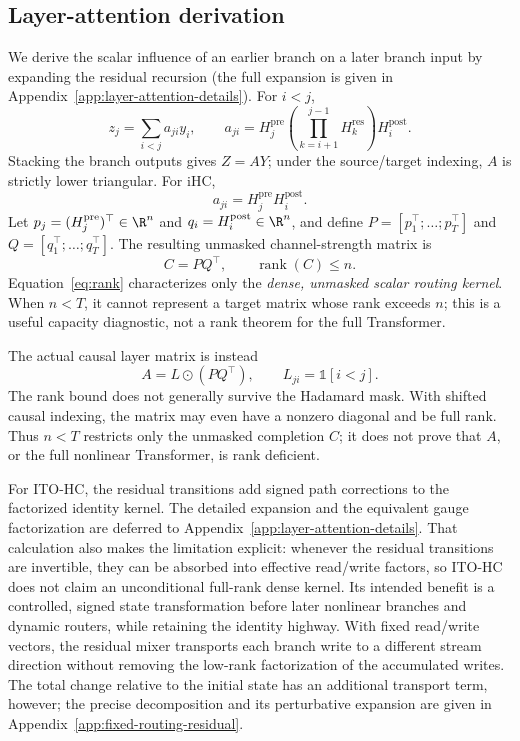 \documentclass{article}
\newcommand{\Hpre}{H^{\mathrm{pre}}}
\newcommand{\Hpost}{H^{\mathrm{post}}}
\newcommand{\Hres}{H^{\mathrm{res}}}
\begin{document}
\subsection{Layer-attention derivation}
We derive the scalar influence of an earlier branch on a later branch input by
expanding the residual recursion (the full expansion is given in
Appendix~\ref{app:layer-attention-details}). For $i<j$,
\begin{equation}
 z_j=\sum_{i<j}a_{ji}y_i,\qquad
 a_{ji}=\Hpre_j\left(\prod_{k=i+1}^{j-1}\Hres_k\right)\Hpost_i.
 \label{eq:aji}
\end{equation}
Stacking the branch outputs gives $Z=AY$; under the source/target indexing,
$A$ is strictly lower triangular. For iHC,
\begin{equation}
 a_{ji}=\Hpre_j\Hpost_i.
 \label{eq:identity-a}
\end{equation}
Let $p_j=(\Hpre_j)^\top\in\R^n$ and $q_i=\Hpost_i\in\R^n$, and define $P=[p_1^\top;\ldots;p_T^\top]$ and $Q=[q_1^\top;\ldots;q_T^\top]$. The resulting unmasked channel-strength matrix is
\begin{equation}
 C=PQ^\top,\qquad \operatorname{rank}(C)\le n.
 \label{eq:rank}
\end{equation}
Equation~\ref{eq:rank} characterizes only the \emph{dense, unmasked scalar
routing kernel}. When $n<T$, it cannot represent a target matrix whose rank
exceeds $n$; this is a useful capacity diagnostic, not a rank theorem for the
full Transformer.

The actual causal layer matrix is instead
\begin{equation}
 A=L\odot(PQ^\top),\qquad L_{ji}=\mathbb{1}[i<j].
 \label{eq:masked}
\end{equation}
The rank bound does not generally survive the Hadamard mask. With shifted
causal indexing, the matrix may even have a nonzero diagonal and be full rank.
Thus $n<T$ restricts only the unmasked completion $C$; it does not prove that
$A$, or the full nonlinear Transformer, is rank deficient.

For ITO-HC, the residual transitions add signed path corrections to the
factorized identity kernel. The detailed expansion and the equivalent gauge
factorization are deferred to Appendix~\ref{app:layer-attention-details}.
That calculation also makes the limitation explicit: whenever the residual
transitions are invertible, they can be absorbed into effective read/write
factors, so ITO-HC does not claim an unconditional full-rank dense kernel.
Its intended benefit is a controlled, signed state transformation before later
nonlinear branches and dynamic routers, while retaining the identity highway.
With fixed read/write vectors, the residual mixer transports each branch write
to a different stream direction without removing the low-rank factorization of
the accumulated writes.  The total change relative to the initial state has
an additional transport term, however; the precise decomposition and its
perturbative expansion are given in Appendix~\ref{app:fixed-routing-residual}.
\end{document}
